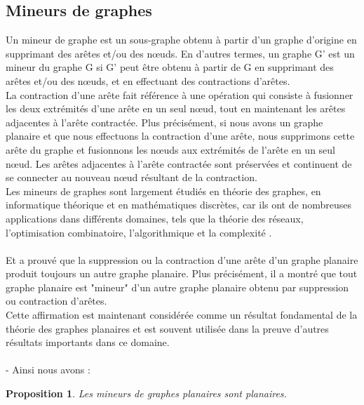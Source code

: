 \documentclass[hidelinks,letterpaper,12pt]{article}
\newtheorem{prop}{Proposition}
\newtheorem{theorem}{Theorem}[section]
\begin{document}
\subsection{Mineurs de graphes}
\label{Mineurs de graphes}
Un mineur de graphe est un sous-graphe obtenu à partir d'un graphe d'origine en supprimant des arêtes et/ou des nœuds. En d'autres termes, un graphe G' est un mineur du graphe G si G' peut être obtenu à partir de G en supprimant des arêtes et/ou des nœuds, et en effectuant des contractions d'arêtes.
\\
La contraction d'une arête fait référence à une opération qui consiste à fusionner les deux extrémités d'une arête en un seul nœud, tout en maintenant les arêtes adjacentes à l'arête contractée. Plus précisément, si nous avons un graphe planaire et que nous effectuons la contraction d'une arête, nous supprimons cette arête du graphe et fusionnons les nœuds aux extrémités de l'arête en un seul nœud. Les arêtes adjacentes à l'arête contractée sont préservées et continuent de se connecter au nouveau nœud résultant de la contraction.
\\
Les mineurs de graphes sont largement étudiés en théorie des graphes, en informatique théorique et en mathématiques discrètes, car ils ont de nombreuses applications dans différents domaines, tels que la théorie des réseaux, l'optimisation combinatoire, l'algorithmique et la complexité \cite{DieterJungnickel} \cite{RDiestel}.	
\\ \\
Et \cite{HasslerWhitney} a prouvé que la suppression ou la contraction d'une arête d'un graphe planaire produit toujours un autre graphe planaire. Plus précisément, il a montré que tout graphe planaire est "mineur" d'un autre graphe planaire obtenu par suppression ou contraction d'arêtes.
\\
Cette affirmation est maintenant considérée comme un résultat fondamental de la théorie des graphes planaires et est souvent utilisée dans la preuve d'autres résultats importants dans ce domaine.
\\ \\
\noindent{}	
{\color{white}-} %
\bigbreak
Ainsi nous avons :	
\begin{prop}
Les mineurs de graphes planaires sont planaires.
\end{prop}
\end{document}
